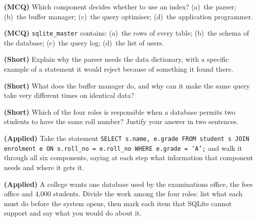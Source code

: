 \begin{reviewq}
  \item \textbf{(MCQ)} Which component decides whether to use an index?
        (a)~the parser; (b)~the buffer manager; (c)~the query optimiser;
        (d)~the application programmer.
  \item \textbf{(MCQ)} \texttt{sqlite\_master} contains: (a)~the rows of every
        table; (b)~the schema of the database; (c)~the query log;
        (d)~the list of users.
  \item \textbf{(Short)} Explain why the parser needs the data dictionary, with
        a specific example of a statement it would reject because of
        something it found there.
  \item \textbf{(Short)} What does the buffer manager do, and why can it make
        the same query take very different times on identical data?
  \item \textbf{(Short)} Which of the four roles is responsible when a database
        permits two students to have the same roll number? Justify your answer
        in two sentences.
  \item \textbf{(Applied)} Take the statement \texttt{SELECT s.name, e.grade
        FROM student s JOIN enrolment e ON s.roll\_no = e.roll\_no WHERE
        e.grade = 'A';} and walk it through all six components, saying at each
        step what information that component needs and where it gets it.
  \item \textbf{(Applied)} A college wants one database used by the
        examinations office, the fees office and 4{,}000 students. Divide the
        work among the four roles: list what each must do before the system
        opens, then mark each item that SQLite cannot support and say what you
        would do about it.
\end{reviewq}
